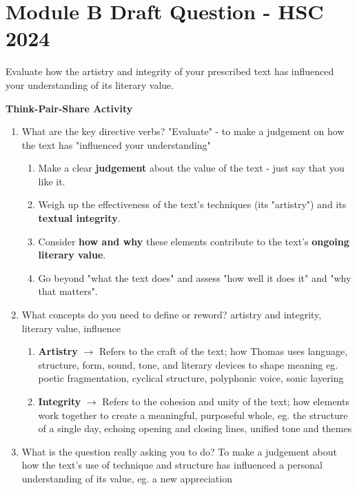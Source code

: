 \newpage

\section{Module B Draft Question - HSC 2024} \label{22/05/2025}

	Evaluate how the artistry and integrity of your prescribed text has influenced your understanding of its literary value.

	\textbf{Think-Pair-Share Activity}
		
		\begin{enumerate}
			\item What are the key directive verbs?
				\subitem "Evaluate" - to make a judgement on how the text has "influenced your understanding"
				\begin{enumerate}
					\item Make a clear \textbf{judgement} about the value of the text - just say that you like it.
					\item Weigh up the effectiveness of the text's techniques (its "artistry") and its \textbf{textual integrity}.
					\item Consider \textbf{how and why} these elements contribute to the text's \textbf{ongoing literary value}.
					\item Go beyond "what the text does" and assess "how well it does it" and "why that matters".
				\end{enumerate}

			\item What concepts do you need to define or reword?
				\subitem artistry and integrity, literary value, influence
				\begin{enumerate}
					\item \textbf{Artistry} $\rightarrow$ Refers to the craft of the text; how Thomas uses language, structure, form, sound, tone, and literary devices to shape meaning eg. poetic fragmentation, cyclical structure, polyphonic voice, sonic layering
					\item \textbf{Integrity} $\rightarrow$ Refers to the cohesion and unity of the text; how elements work together to create a meaningful, purposeful whole, eg. the structure of a single day, echoing opening and closing lines, unified tone and themes
				\end{enumerate}

			\item What is the question really asking you to do?
				\subitem To make a judgement about how the text's use of technique and structure has influenced a personal understanding of its value, eg. a new appreciation
		\end{enumerate}

